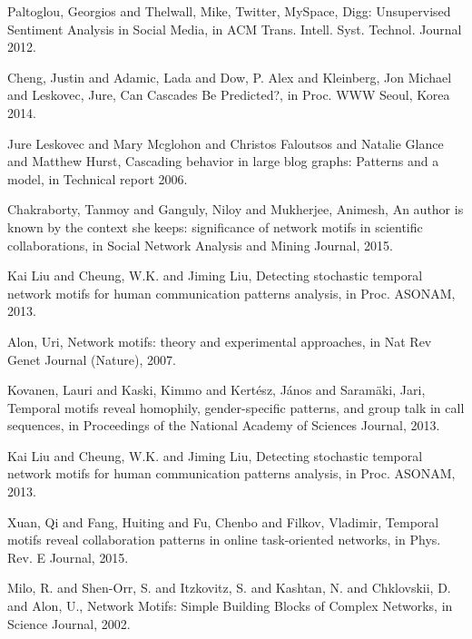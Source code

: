 \documentclass[smallextended]{svjour3}       %
\theoremstyle{definition}
\begin{document}
\begin{thebibliography}{}
{Paltoglou, Georgios and Thelwall, Mike},
Twitter, MySpace, Digg: Unsupervised Sentiment Analysis in Social Media,
in ACM Trans. Intell. Syst. Technol. Journal
{2012.}

{Cheng, Justin and Adamic, Lada and Dow, P. Alex and Kleinberg, Jon Michael and Leskovec, Jure},
Can Cascades Be Predicted?,
in Proc. WWW Seoul, Korea
{2014.}

{Jure Leskovec and Mary Mcglohon and Christos Faloutsos and Natalie Glance and Matthew Hurst},
Cascading behavior in large blog graphs: Patterns and a model,
in Technical report
{2006.}

{Chakraborty, Tanmoy and Ganguly, Niloy and Mukherjee, Animesh},
An author is known by the context she keeps: significance of network motifs in scientific collaborations,
in Social Network Analysis and Mining Journal,
{2015.}

{Kai Liu and Cheung, W.K. and Jiming Liu},
Detecting stochastic temporal network motifs for human communication patterns analysis,
in Proc. ASONAM,
{2013.}

{Alon, Uri},
Network motifs: theory and experimental approaches,
in Nat Rev Genet Journal (Nature),
{2007.}

{Kovanen, Lauri and Kaski, Kimmo and Kertész, János and Saramäki, Jari},
Temporal motifs reveal homophily, gender-specific patterns, and group talk in call sequences,
in Proceedings of the National Academy of Sciences Journal,
{2013.}

{Kai Liu and Cheung, W.K. and Jiming Liu},
Detecting stochastic temporal network motifs for human communication patterns analysis,
in Proc. ASONAM,
{2013.}

{Xuan, Qi and Fang, Huiting and Fu, Chenbo and Filkov, Vladimir},
Temporal motifs reveal collaboration patterns in online task-oriented networks,
in Phys. Rev. E Journal,
{2015.}

{Milo, R. and Shen-Orr, S. and Itzkovitz, S. and Kashtan, N. and Chklovskii, D. and Alon, U.},
Network Motifs: Simple Building Blocks of Complex Networks,
in Science Journal,
{2002.}


\end{thebibliography}
\end{document}
